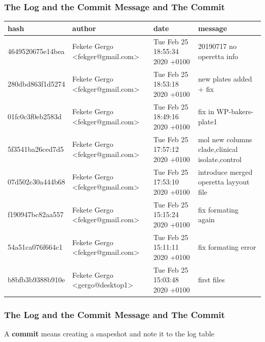 \documentclass[aspectratio=169]{beamer}
\begin{document}
\begin{frame}
\frametitle<presentation>{The Log and the Commit Message and The Commit}
\begin{table}
\tiny
\begin{tabular}{|p{2cm}|p{3cm}|p{3cm}|p{4cm}| }
 \hline
 hash & author & date & message\\ 
 \hline
 4649520675e14bea&Fekete Gergo <fekger@gmail.com>&Tue Feb 25 18:55:34 2020 +0100& 20190717 no operetta info\\
 280dbd863f1d5274&Fekete Gergo <fekger@gmail.com>&Tue Feb 25 18:53:18 2020 +0100& new plates added + fix\\
 01fc0c3f0eb2583d&Fekete Gergo <fekger@gmail.com>&Tue Feb 25 18:49:16 2020 +0100& fix in WP-bakers-plate1\\
 5f3541ba26ced7d5&Fekete Gergo <fekger@gmail.com>&Tue Feb 25 17:57:12 2020 +0100& mol new columns clade,clinical isolate,control\\
 07d502c30a444b68&Fekete Gergo <fekger@gmail.com>&Tue Feb 25 17:53:10 2020 +0100& introduce merged operetta layyout file\\
 f190947bc82aa557&Fekete Gergo <fekger@gmail.com>&Tue Feb 25 15:15:24 2020 +0100& fix formating again\\
 54a51ca076f664c1&Fekete Gergo <fekger@gmail.com>&Tue Feb 25 15:11:11 2020 +0100& fix formating error\\
 b8bfb3b9388b910e&Fekete Gergo <gergo@desktop1>&Tue Feb 25 15:03:48 2020 +0100& first files\\
 \end{tabular}

\end{table}


\end{frame}

\begin{frame}
\frametitle<presentation>{The Log and the Commit Message and The Commit}

  A \textbf{commit} means creating a snapeshot and note it to the log table
  
\end{frame}
\end{document}
